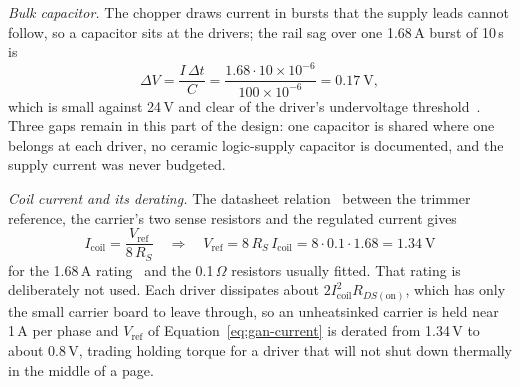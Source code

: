 \emph{Bulk capacitor.}
The chopper draws current in bursts that the supply leads cannot follow, so a capacitor sits at the drivers; the rail sag over one 1.68\,A burst of 10\,\textmu s is
\begin{equation}
\Delta V=\frac{I\,\Delta t}{C}=\frac{1.68\cdot10\times10^{-6}}{100\times10^{-6}}=0.17\ \mathrm{V},
\label{eq:gan-bulk}
\end{equation}
which is small against 24\,V and clear of the driver's undervoltage threshold~\cite{a4988ds}.
Three gaps remain in this part of the design: one capacitor is shared where one belongs at each driver, no ceramic logic-supply capacitor is documented, and the supply current was never budgeted.

\emph{Coil current and its derating.}
The datasheet relation~\cite{a4988ds} between the trimmer reference, the carrier's two sense resistors and the regulated current gives
\begin{equation}
I_{\mathrm{coil}}=\frac{V_{\mathrm{ref}}}{8\,R_S}\quad\Longrightarrow\quad V_{\mathrm{ref}}=8\,R_S\,I_{\mathrm{coil}}=8\cdot0.1\cdot1.68=1.34\ \mathrm{V}
\label{eq:gan-current}
\end{equation}
for the 1.68\,A rating~\cite{stepperds} and the 0.1\,$\Omega$ resistors usually fitted.
That rating is deliberately not used.
Each driver dissipates about $2I_{\mathrm{coil}}^2R_{DS(\mathrm{on})}$, which has only the small carrier board to leave through, so an unheatsinked carrier is held near 1\,A per phase and $V_{\mathrm{ref}}$ of Equation~\ref{eq:gan-current} is derated from 1.34\,V to about 0.8\,V, trading holding torque for a driver that will not shut down thermally in the middle of a page.

